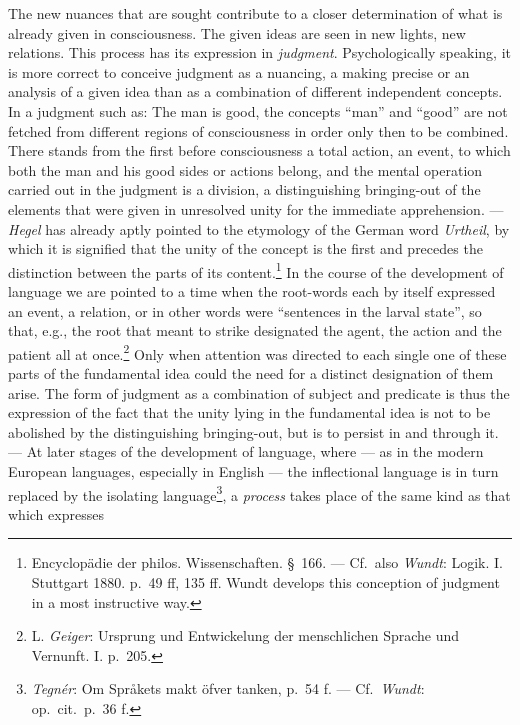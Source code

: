 \documentclass[12pt,a4paper]{book}
\newcommand{\opage}[1]{\marginnote{\footnotesize\textit{[#1]}}}
\begin{document}
The new nuances that are sought contribute to a closer determination of
what is already given in consciousness. The given ideas are seen in new
lights, new relations. This process has its expression in
\emph{judgment}. Psychologically speaking, it is more correct to
conceive judgment as a nuancing, a making precise or an analysis of a
given idea than as a combination of different independent concepts. In a
judgment such as: The man is good, the concepts ``man'' and ``good'' are
not fetched from different
\opage{219}regions of consciousness in order only then to be combined.
There stands from the first before consciousness a total action, an
event, to which both the man and his good sides or actions belong, and
the mental operation carried out in the judgment is a division, a
distinguishing bringing-out of the elements that were given in
unresolved unity for the immediate apprehension. --- \emph{Hegel} has
already aptly pointed to the etymology of the German word
\textit{Urtheil}, by which it is signified that the unity of the concept
is the first and precedes the distinction between the parts of its
content.\footnote{Encyclopädie der philos. Wissenschaften. §~166. ---
Cf.\ also \emph{Wundt}: Logik. I. Stuttgart 1880. p.~49 ff, 135 ff.
Wundt develops this conception of judgment in a most instructive way.}
In the course of the development of language we are pointed to a time
when the root-words each by itself expressed an event, a relation, or in
other words were ``sentences in the larval state'', so that, e.g., the
root that meant to strike designated the agent, the action
and the patient all at once.\footnote{L. \emph{Geiger}: Ursprung und
Entwickelung der menschlichen Sprache und Vernunft. I. p.~205.} Only
when attention was directed to each single one of these parts of the
fundamental idea could the need for a distinct designation of them
arise. The form of judgment as a combination of subject and predicate is
thus the expression of the fact that the unity lying in the fundamental
idea is not to be abolished by the distinguishing bringing-out, but is
to persist in and through it. --- At later stages of the development of
language, where --- as in the modern European languages, especially in
English --- the inflectional language is in turn replaced by the
isolating language\footnote{\emph{Tegnér}: Om Språkets makt öfver
tanken, p.~54 f. --- Cf.\ \emph{Wundt}: op.\ cit.\ p.~36 f.}, a
\emph{process} takes place of the same kind as that which expresses
\end{document}
